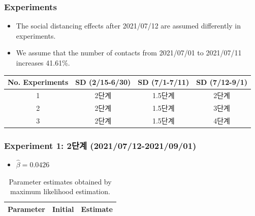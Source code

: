 \documentclass[aspectratio=169, 9pt, xcolor=dvipsnames]{beamer}
\begin{document}
	\begin{frame}\frametitle{Experiments}
	    \begin{itemize}
	    	\item The social distancing effects after 2021/07/12 are assumed differently in experiments.
	    	\item We assume that the number of contacts from 2021/07/01 to 2021/07/11 increases 41.61\%.
	    \end{itemize}
	    \begin{table}
	    	\begin{tabular}{cccc}
	    		\toprule
	    		\textbf{No. Experiments} & \textbf{SD (2/15-6/30)} & \textbf{SD (7/1-7/11)} & \textbf{SD (7/12-9/1)} \\
	    		\midrule
	 			1 & 2단계 & 1.5단계 & \textcolor{NavyBlue}{2단계} \\
	 			2 & 2단계 & 1.5단계 & \textcolor{NavyBlue}{3단계} \\
	 			3 & 2단계 & 1.5단계 & \textcolor{NavyBlue}{4단계} \\
	    		\bottomrule
	    	\end{tabular}
	    \end{table}
	\end{frame}

	\begin{frame}\frametitle{Experiment 1: 2단계 (2021/07/12-2021/09/01)}
	    \begin{itemize}
			\item $\hat{\beta} = 0.0426$
		\end{itemize}
	    \begin{table}
	    	\begin{tabular}{crr}
	    		\toprule
	    		\textbf{Parameter} & \textbf{Initial} & \textbf{Estimate} \\
	    		\midrule
	    		
	    		\bottomrule
	    	\end{tabular}
	    	\caption{Parameter estimates obtained by maximum likelihood estimation.}
	    \end{table}
	\end{frame}
\end{document}
